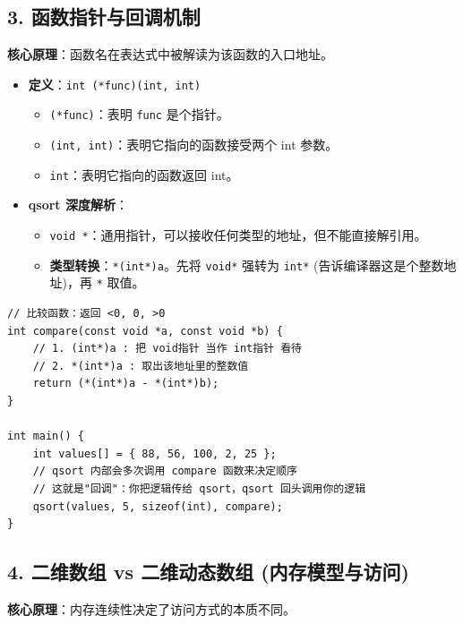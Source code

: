 \documentclass[a4paper,12pt]{article}
\begin{document}
\subsection{3. 函数指针与回调机制}
\textbf{核心原理}：函数名在表达式中被解读为该函数的入口地址。
\begin{itemize}
    \item \textbf{定义}：\texttt{int (*func)(int, int)}
    \begin{itemize}
        \item \texttt{(*func)}：表明 \texttt{func} 是个指针。
        \item \texttt{(int, int)}：表明它指向的函数接受两个 int 参数。
        \item \texttt{int}：表明它指向的函数返回 int。
    \end{itemize}
    \item \textbf{qsort 深度解析}：
    \begin{itemize}
        \item \texttt{void *}：通用指针，可以接收任何类型的地址，但不能直接解引用。
        \item \textbf{类型转换}：\texttt{*(int*)a}。先将 \texttt{void*} 强转为 \texttt{int*} (告诉编译器这是个整数地址)，再 \texttt{*} 取值。
    \end{itemize}
\end{itemize}
\begin{lstlisting}
// 比较函数：返回 <0, 0, >0
int compare(const void *a, const void *b) {
    // 1. (int*)a : 把 void指针 当作 int指针 看待
    // 2. *(int*)a : 取出该地址里的整数值
    return (*(int*)a - *(int*)b); 
}

int main() {
    int values[] = { 88, 56, 100, 2, 25 };
    // qsort 内部会多次调用 compare 函数来决定顺序
    // 这就是"回调"：你把逻辑传给 qsort，qsort 回头调用你的逻辑
    qsort(values, 5, sizeof(int), compare);
}
\end{lstlisting}

\subsection{4. 二维数组 vs 二维动态数组 (内存模型与访问)}
\textbf{核心原理}：内存连续性决定了访问方式的本质不同。
\end{document}

